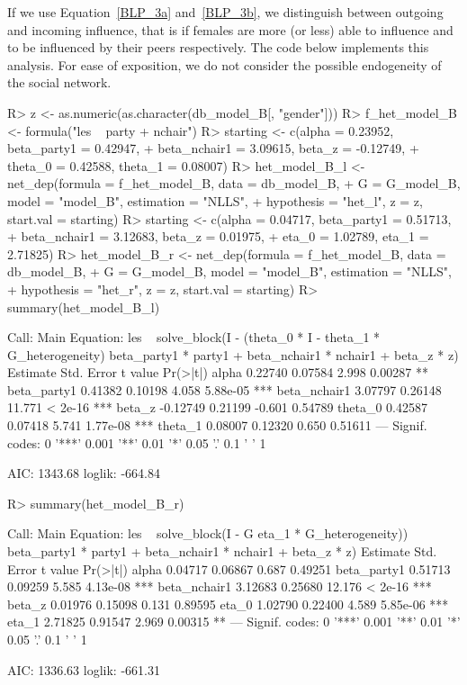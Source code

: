 \documentclass[nojss]{jss}
\begin{document}
If we use Equation~\ref{BLP_3a} and~\ref{BLP_3b}, we distinguish between
outgoing and incoming influence, that is if females are more (or less) able
to influence and to be influenced by their peers respectively.  The code
below implements this analysis.  For ease of exposition, we do not consider
the possible endogeneity of the social network.
%
\begin{CodeChunk}
\begin{CodeInput}
R> z <- as.numeric(as.character(db_model_B[, "gender"]))
R> f_het_model_B <- formula("les ~ party + nchair")
R> starting <- c(alpha = 0.23952, beta_party1 = 0.42947,
+    beta_nchair1 = 3.09615, beta_z = -0.12749,
+    theta_0 = 0.42588, theta_1 = 0.08007)
R> het_model_B_l <- net_dep(formula = f_het_model_B, data = db_model_B,
+    G = G_model_B, model = "model_B", estimation = "NLLS",
+    hypothesis = "het_l", z = z, start.val = starting)
R> starting <- c(alpha = 0.04717, beta_party1 = 0.51713,
+    beta_nchair1 = 3.12683, beta_z = 0.01975,
+    eta_0 = 1.02789, eta_1 = 2.71825)
R> het_model_B_r <- net_dep(formula = f_het_model_B, data = db_model_B,
+    G = G_model_B, model = "model_B", estimation = "NLLS",
+    hypothesis = "het_r", z = z, start.val = starting)
R> summary(het_model_B_l)
\end{CodeInput}
\begin{CodeOutput}
Call:
Main Equation:  les ~ solve_block(I - (theta_0 * I - 
theta_1 * G_heterogeneity) %
beta_party1 * party1 + beta_nchair1 * nchair1 + beta_z * z)
             Estimate Std. Error t value Pr(>|t|)    
alpha         0.22740    0.07584   2.998  0.00287 ** 
beta_party1   0.41382    0.10198   4.058 5.88e-05 ***
beta_nchair1  3.07797    0.26148  11.771  < 2e-16 ***
beta_z       -0.12749    0.21199  -0.601  0.54789    
theta_0       0.42587    0.07418   5.741 1.77e-08 ***
theta_1       0.08007    0.12320   0.650  0.51611    
---
Signif. codes:  0 '***' 0.001 '**' 0.01 '*' 0.05 '.' 0.1 ' ' 1

AIC: 1343.68  loglik: -664.84
\end{CodeOutput}
\begin{CodeInput}
R> summary(het_model_B_r)
\end{CodeInput}
\begin{CodeOutput}
Call:
Main Equation: les ~ solve_block(I - G %
eta_1 * G_heterogeneity)) %
beta_party1 * party1 + beta_nchair1 * nchair1 + beta_z * z)
             Estimate Std. Error t value Pr(>|t|)  
alpha         0.04717    0.06867   0.687  0.49251    
beta_party1   0.51713    0.09259   5.585 4.13e-08 ***
beta_nchair1  3.12683    0.25680  12.176  < 2e-16 ***
beta_z        0.01976    0.15098   0.131  0.89595    
eta_0         1.02790    0.22400   4.589 5.85e-06 ***
eta_1         2.71825    0.91547   2.969  0.00315 ** 
---
Signif. codes:  0 '***' 0.001 '**' 0.01 '*' 0.05 '.' 0.1 ' ' 1

AIC: 1336.63  loglik: -661.31
\end{CodeOutput}
\end{CodeChunk}
\end{document}
